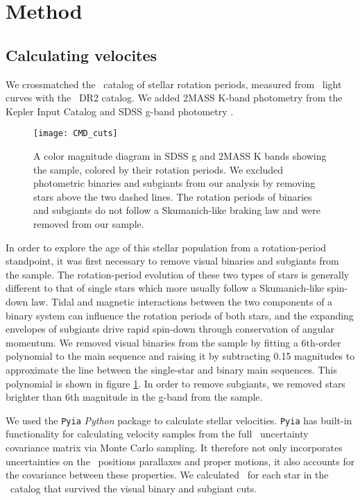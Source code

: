 \section{Method}

\subsection{Calculating velocites}

We crossmatched the \mct\ catalog of stellar rotation periods, measured from
\kepler\ light curves with the \gaia\ DR2 catalog.
We added 2MASS K-band photometry from the Kepler Input Catalog
\citep{brown2011} and SDSS g-band photometry .

\begin{figure}
  \caption{
A color magnitude diagram in SDSS g and 2MASS K bands showing the
\citet{mcquillan2014} sample, colored by their rotation periods.
We excluded photometric binaries and subgiants from our analysis by removing
stars above the two dashed lines.
The rotation periods of binaries and subgiants do not follow a Skumanich-like
braking law and were removed from our sample.
}
  \centering
    \texttt{[image: CMD\_cuts]}
\label{fig:CMD_cuts}
\end{figure}

In order to explore the age of this stellar population from a rotation-period
standpoint, it was first necessary to remove visual binaries and subgiants
from the sample.
The rotation-period evolution of these two types of stars is generally
different to that of single stars which more usually follow a Skumanich-like
spin-down law.
Tidal and magnetic interactions between the two components of a binary system
can influence the rotation periods of both stars, and the expanding envelopes
of subgiants drive rapid spin-down through conservation of angular momentum.
We removed visual binaries from the sample by fitting a 6th-order polynomial
to the main sequence and raising it by subtracting 0.15 magnitudes to
approximate the line between the single-star and binary main sequences.
This polynomial is shown in figure \ref{fig:CMD_cuts}.
In order to remove subgiants, we removed stars brighter than 6th magnitude in
the g-band from the sample.

We used the {\tt Pyia} {\it Python} package to calculate stellar velocities.
{\tt Pyia} has built-in functionality for calculating velocity samples from
the full \gaia\ uncertainty covariance matrix via Monte Carlo sampling.
It therefore not only incorporates uncertainties on the \gaia\ positions
parallaxes and proper motions, it also accounts for the covariance between
these properties.
We calculated \vb\ for each star in the \mct\ catalog that survived the visual
binary and subgiant cuts.

